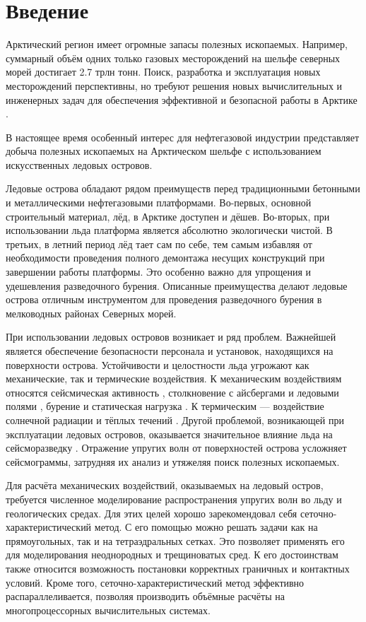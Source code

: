 \section{Введение}

Арктический регион имеет огромные запасы полезных ископаемых. Например, суммарный объём одних только газовых месторождений на шельфе северных морей достигает 2.7 трлн тонн. Поиск, разработка и эксплуатация новых месторождений перспективны, но требуют решения новых вычислительных и инженерных задач для обеспечения эффективной и безопасной работы в Арктике \cite{petrov_arctic}.

В настоящее время особенный интерес для нефтегазовой индустрии представляет добыча полезных ископаемых на Арктическом шельфе с использованием искусственных ледовых островов. 

Ледовые острова обладают рядом преимуществ перед традиционными бетонными и металлическими нефтегазовыми платформами. Во-первых, основной строительный материал, лёд, в Арктике доступен и дёшев. Во-вторых, при использовании льда платформа является абсолютно экологически чистой. В третьих, в летний период лёд тает сам по себе, тем самым избавляя от необходимости проведения полного демонтажа несущих конструкций при завершении работы платформы. Это особенно важно для упрощения и удешевления разведочного бурения. Описанные преимущества делают ледовые острова отличным инструментом для проведения разведочного бурения в мелководных районах Северных морей.

При использовании ледовых островов возникает и ряд проблем. Важнейшей является обеспечение безопасности персонала и установок, находящихся на  поверхности острова. Устойчивости и целостности льда угрожают как механические, так и термические воздействия. К механическим воздействиям относятся сейсмическая активность \cite{ice_during_earthquake}, столкновение с айсбергами и ледовыми полями \cite{iceberg_crash, iceberg_crash2}, бурение и статическая нагрузка \cite{epifanov_crash}. К термическим --- воздействие солнечной радиации и тёплых течений  \cite{canadian_arctic, petrov_arctic}. Другой проблемой, возникающей при эксплуатации ледовых островов, оказывается значительное влияние льда на сейсморазведку \cite{stogniy_ice_influence}. Отражение упругих волн от поверхностей острова усложняет сейсмограммы, затрудняя их анализ и утяжеляя поиск полезных ископаемых.

Для расчёта механических воздействий, оказываемых на ледовый остров, требуется численное моделирование распространения упругих волн во льду и геологических средах. Для этих целей хорошо зарекомендовал себя  сеточно-характеристичес\-кий метод. С его помощью можно решать задачи как на прямоугольных, так и на тетраэдральных сетках. Это позволяет применять его для моделирования неоднородных и трещиноватых сред. К его достоинствам также относится возможность постановки корректных граничных и контактных условий. Кроме того, сеточно-характеристический метод эффективно распараллеливается, позволяя производить объёмные расчёты на многопроцессорных вычислительных системах.  \cite{petrov_arctic, zhdanov_gcm, biryukov_fractured_layers, favorskaya_thesis, grigoriev}


